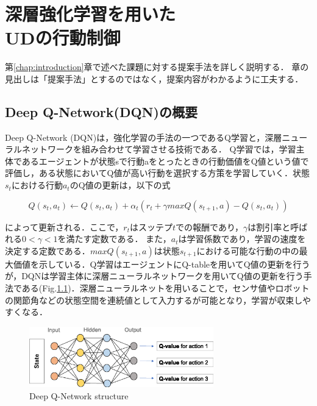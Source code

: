 \documentclass[12pt]{sonota/aislab}
\begin{document}
\chapter{深層強化学習を用いた \\ UDの行動制御}\label{chap:proposal}
第\ref{chap:introduction}章で述べた課題に対する提案手法を詳しく説明する．
章の見出しは「提案手法」とするのではなく，提案内容がわかるように工夫する．

\section{Deep Q-Network(DQN)の概要}
Deep Q-Network (DQN)は，強化学習の手法の一つであるQ学習と，深層ニューラルネットワークを組み合わせて学習させる技術である\cite{drl}． Q学習では，学習主体であるエージェントが状態sで行動aをとったときの行動価値をQ値という値で評価し，ある状態においてQ値が高い行動を選択する方策を学習していく．状態$s_{t}$における行動$a_{t}$のQ値の更新は，以下の式

\begin{equation}
\label{q_update}
Q(s_{t},a_{t} )←Q(s_{t},a_{t} )+ α_{t} (r_{t}+ \gamma maxQ(s_{t+1},a)-Q(s_{t},a_{t}))
\end{equation}

によって更新される．ここで，$r_{t}$はスッテプ$t$での報酬であり，$\gamma$は割引率と呼ばれる$ 0 < \gamma <1 $を満たす定数である．
また，$a_{t}$は学習係数であり，学習の速度を決定する定数である．$maxQ(s_{t+1},a)$は状態$s_{t+1}$における可能な行動の中の最大価値を示している．Q学習はエージェントにQ-tableを用いてQ値の更新を行うが，DQNは学習主体に深層ニューラルネットワークを用いてQ値の更新を行う手法である(Fig.\ref{DQN})．深層ニューラルネットを用いることで，センサ値やロボットの関節角などの状態空間を連続値として入力するが可能となり，学習が収束しやすくなる．


\begin{figure}[t]
\begin{center}
\includegraphics[clip, width=8cm]{figs/dqn_network.eps}
\caption{Deep Q-Network structure}
\label{DQN}
\end{center}
\end{figure}
\end{document}

